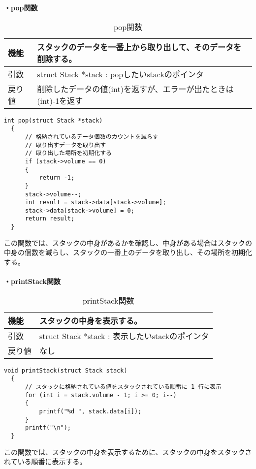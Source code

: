 \documentclass[dvipdfmx]{jsarticle}
\begin{document}
\newpage
\textbf{・pop関数}
\begin{table}[ht]
  \centering
  \caption{pop関数}
  \begin{tabular}{|p{5cm}|p{10cm}|}
    \hline
    機能  & スタックのデータを一番上から取り出して、そのデータを削除する。        \\
    \hline
    引数  & struct Stack *stack : popしたいstackのポインタ \\
    \hline
    戻り値 & 削除したデータの値(int)を返すが、エラーが出たときは(int)-1を返す \\
    \hline
  \end{tabular}
  \label{tab:pop_func}
\end{table}
\begin{lstlisting}[caption={pop関数}, label={lst:pop_func}]
  int pop(struct Stack *stack)
  {
      // 格納されているデータ個数のカウントを減らす
      // 取り出すデータを取り出す
      // 取り出した場所を初期化する
      if (stack->volume == 0)
      {
          return -1;
      }
      stack->volume--;
      int result = stack->data[stack->volume];
      stack->data[stack->volume] = 0;
      return result;
  }
\end{lstlisting}
この関数では、スタックの中身があるかを確認し、中身がある場合はスタックの中身の個数を減らし、スタックの一番上のデータを取り出し、その場所を初期化する。
\\\\
\textbf{・printStack関数}
\begin{table}[ht]
  \centering
  \caption{printStack関数}
  \begin{tabular}{|p{5cm}|p{10cm}|}
    \hline
    機能  & スタックの中身を表示する。                         \\
    \hline
    引数  & struct Stack *stack : 表示したいstackのポインタ \\
    \hline
    戻り値 & なし                                    \\
    \hline
  \end{tabular}
  \label{tab:printstack_func}
\end{table}
\begin{lstlisting}[caption={printStack関数}, label={lst:printstack_func}]
  void printStack(struct Stack stack)
  {
      // スタックに格納されている値をスタックされている順番に 1 行に表示
      for (int i = stack.volume - 1; i >= 0; i--)
      {
          printf("%d ", stack.data[i]);
      }
      printf("\n");
  }
\end{lstlisting}
この関数では、スタックの中身を表示するために、スタックの中身をスタックされている順番に表示する。\\
\end{document}
